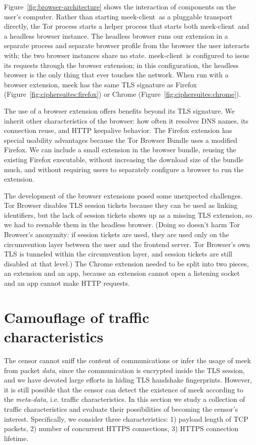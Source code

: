 \documentclass[conference]{IEEEtran}
\def\meekclient{\mbox{meek-client}}
\begin{document}
Figure~\ref{fig:browser-architecture} shows the interaction of components
on the user's computer.
Rather than starting \meekclient\ as a pluggable transport directly, the Tor
process starts a helper process that starts both \meekclient\
and a headless browser instance.
The headless browser runs our extension in a separate
process and separate browser profile from the browser the
user interacts with; the two browser instances share no state.
\meekclient\ is configured to issue its requests through the browser extension;
in this configuration, the headless browser is the only thing that ever touches the network.
When run with a browser extension, meek has the same TLS signature
as Firefox (Figure~\ref{fig:ciphersuites:firefox}) or
Chrome (Figure~\ref{fig:ciphersuites:chrome}).

The use of a browser extension offers benefits beyond its TLS signature.
We inherit other characteristics of the browser:
how often it resolves DNS names,
its connection reuse,
and HTTP keepalive behavior.
The Firefox extension has special usability advantages because the Tor Browser Bundle
uses a modified Firefox.
We can include a small extension in the browser bundle, reusing the existing
Firefox executable, without increasing the download size of the bundle much,
and without requiring users to separately configure a browser to run the extension.

The development of the browser extensions posed some unexpected challenges.
Tor Browser disables TLS session tickets because they can be used as linking identifiers,
but the lack of session tickets shows up as a missing TLS extension,
so we had to reenable them in the headless browser.
(Doing so doesn't harm Tor Browser's anonymity:
if session tickets are used, they are used only on the circumvention layer
between the user and the frontend server. Tor Browser's own TLS is tunneled
within the circumvention layer, and session tickets are still disabled at that level.)
The Chrome extension needed to be split into two pieces, an extension and an app,
because an extension cannot open a listening socket and an app cannot make HTTP requests.

\section{Camouflage of traffic characteristics}
\label{sec:trafficstatistics}

The censor cannot sniff the content of communications or infer the usage of meek 
from packet \emph{data}, 
since the communication is encrypted inside the TLS session, and we have devoted large efforts 
in hiding TLS handshake fingerprints. However, it is still possible that the censor can detect 
the existence of meek according to the \emph{meta-data}, i.e. traffic characteristics. 
In this section we study a collection of traffic characteristics and evaluate their possibilities of becoming
the censor's interest. Specifically, we consider three characteristics: 1) payload length of
TCP packets, 2) number of concurrent HTTPS connections, 3) HTTPS connection lifetime. 
\end{document}
